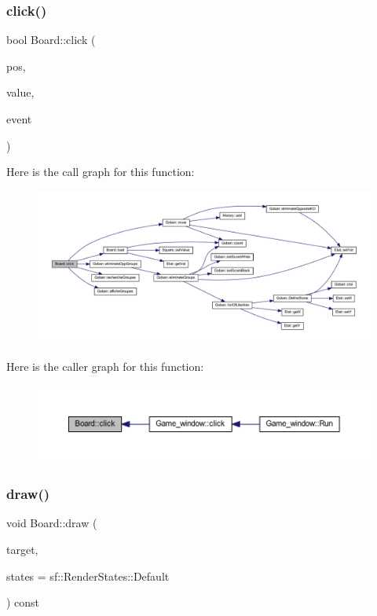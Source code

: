 \subsubsection{\texorpdfstring{click()}{click()}}
{\footnotesize\ttfamily bool Board\+::click (\begin{DoxyParamCaption}\item[{sf\+::\+Vector2i}]{pos,  }\item[{const \hyperlink{class_square_a7feeec236c037a9849114226adaa4ecc}{Square\+::\+Value} \&}]{value,  }\item[{const sf\+::\+Mouse\+::\+Button \&}]{event }\end{DoxyParamCaption})}

Here is the call graph for this function\+:
\nopagebreak
\begin{figure}[H]
\begin{center}
\leavevmode
\includegraphics[width=350pt]{class_board_a5fda73da080403d8a71a8593d581c350_cgraph}
\end{center}
\end{figure}
Here is the caller graph for this function\+:
\nopagebreak
\begin{figure}[H]
\begin{center}
\leavevmode
\includegraphics[width=350pt]{class_board_a5fda73da080403d8a71a8593d581c350_icgraph}
\end{center}
\end{figure}
\mbox{\label{class_board_a8c86104f9ff30a54cbd7520e006cd609}} 
\subsubsection{\texorpdfstring{draw()}{draw()}}
{\footnotesize\ttfamily void Board\+::draw (\begin{DoxyParamCaption}\item[{sf\+::\+Render\+Target \&}]{target,  }\item[{sf\+::\+Render\+States}]{states = {\ttfamily sf\+:\+:RenderStates\+:\+:Default} }\end{DoxyParamCaption}) const\hspace{0.3cm}{\ttfamily [virtual]}}

